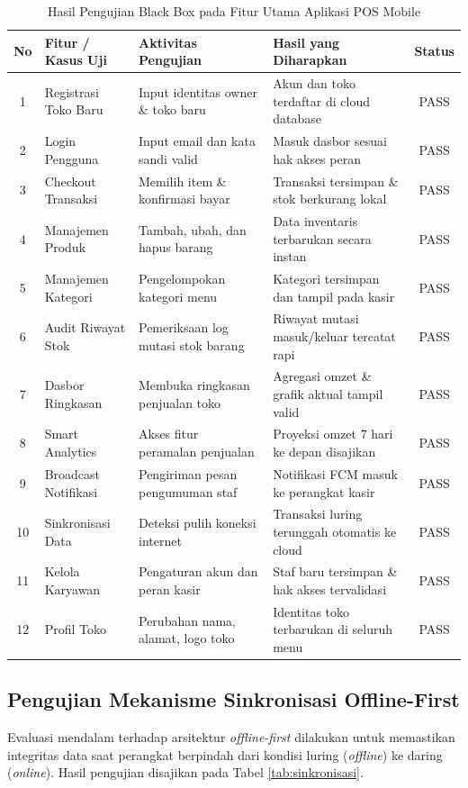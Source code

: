 \documentclass[10pt,a4paper]{article}
\begin{document}
\begin{table}[htbp]
  \centering
  \caption{Hasil Pengujian Black Box pada Fitur Utama Aplikasi POS Mobile}
  \label{tab:blackbox}
  \fontsize{8pt}{10pt}\selectfont
  \begin{tabularx}{\textwidth}{clXXc}
    \toprule
    \textbf{No} & \textbf{Fitur / Kasus Uji} & \textbf{Aktivitas Pengujian} & \textbf{Hasil yang Diharapkan} & \textbf{Status} \\
    \midrule
    1 & Registrasi Toko Baru & Input identitas owner \& toko baru & Akun dan toko terdaftar di cloud database & PASS \\
    2 & Login Pengguna       & Input email dan kata sandi valid   & Masuk dasbor sesuai hak akses peran & PASS \\
    3 & Checkout Transaksi   & Memilih item \& konfirmasi bayar   & Transaksi tersimpan \& stok berkurang lokal & PASS \\
    4 & Manajemen Produk     & Tambah, ubah, dan hapus barang     & Data inventaris terbarukan secara instan & PASS \\
    5 & Manajemen Kategori   & Pengelompokan kategori menu        & Kategori tersimpan dan tampil pada kasir & PASS \\
    6 & Audit Riwayat Stok   & Pemeriksaan log mutasi stok barang & Riwayat mutasi masuk/keluar tercatat rapi & PASS \\
    7 & Dasbor Ringkasan     & Membuka ringkasan penjualan toko   & Agregasi omzet \& grafik aktual tampil valid & PASS \\
    8 & Smart Analytics      & Akses fitur peramalan penjualan    & Proyeksi omzet 7 hari ke depan disajikan & PASS \\
    9 & Broadcast Notifikasi & Pengiriman pesan pengumuman staf   & Notifikasi FCM masuk ke perangkat kasir & PASS \\
    10& Sinkronisasi Data    & Deteksi pulih koneksi internet     & Transaksi luring terunggah otomatis ke cloud & PASS \\
    11& Kelola Karyawan      & Pengaturan akun dan peran kasir    & Staf baru tersimpan \& hak akses tervalidasi & PASS \\
    12& Profil Toko          & Perubahan nama, alamat, logo toko  & Identitas toko terbarukan di seluruh menu & PASS \\
    \bottomrule
  \end{tabularx}
\end{table}

\subsection{Pengujian Mekanisme Sinkronisasi Offline-First}
Evaluasi mendalam terhadap arsitektur \textit{offline-first} dilakukan untuk memastikan integritas data saat perangkat berpindah dari kondisi luring (\textit{offline}) ke daring (\textit{online}). Hasil pengujian disajikan pada Tabel \ref{tab:sinkronisasi}.
\end{document}
